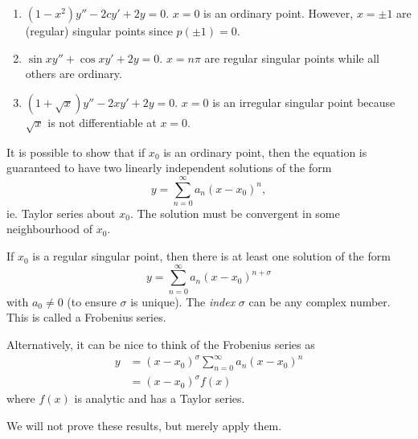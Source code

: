 \documentclass[a4paper]{article}
\begin{document}
\begin{eg}\leavevmode
  \begin{enumerate}
    \item $(1 - x^2)y'' - 2cy' + 2y = 0$. $x = 0$ is an ordinary point. However, $x = \pm 1$ are (regular) singular points since $p(\pm 1) = 0$.
    \item $\sin x y'' + \cos x y' + 2y = 0$. $x = n\pi$ are regular singular points while all others are ordinary.
    \item $(1 + \sqrt{x}) y'' - 2xy' + 2y = 0$. $x = 0$ is an irregular singular point because $\sqrt{x}$ is not differentiable at $x = 0$.
  \end{enumerate}
\end{eg}

It is possible to show that if $x_0$ is an ordinary point, then the equation is guaranteed to have two linearly independent solutions of the form
\[
  y = \sum_{n = 0}^\infty a_n(x - x_0)^n,
\]
ie. Taylor series about $x_0$. The solution must be convergent in some neighbourhood of $x_0$.

If $x_0$ is a regular singular point, then there is at least one solution of the form
\[
  y = \sum_{n = 0}^\infty a_n(x - x_0)^{n + \sigma}
\]
with $a_0 \not= 0$ (to ensure $\sigma$ is unique). The \emph{index} $\sigma$ can be any complex number. This is called a Frobenius series.

Alternatively, it can be nice to think of the Frobenius series as
\begin{align*}
  y &= (x - x_0)^\sigma \sum_{n = 0}^\infty a_n (x - x_0)^n\\
  &= (x-x_0)^\sigma f(x)
\end{align*}
where $f(x)$ is analytic and has a Taylor series.

We will not prove these results, but merely apply them.
\end{document}
